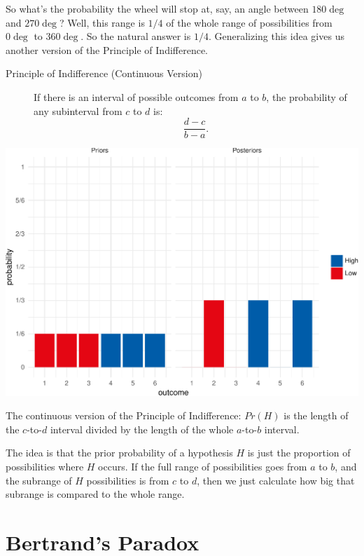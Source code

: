 \documentclass[justified]{tufte-book}
\theoremstyle{definition}
\theoremstyle{definition}
\theoremstyle{definition}
\theoremstyle{remark}
\begin{document}
So what's the probability the wheel will stop at, say, an angle between
\(180\deg\) and \(270\deg\)? Well, this range is \(1/4\) of the whole
range of possibilities from \(0\deg\) to \(360\deg\). So the natural
answer is \(1/4\). Generalizing this idea gives us another version of
the Principle of Indifference.

\begin{description}
\item[Principle of Indifference (Continuous Version)]
If there is an interval of possible outcomes from \(a\) to \(b\), the
probability of any subinterval from \(c\) to \(d\) is:
\[\frac{d-c}{b-a}.\]
\end{description}

\begin{marginfigure}
\includegraphics{_main_files/figure-latex/unnamed-chunk-132-1} \caption[The continuous version of the Principle of Indifference]{The continuous version of the Principle of Indifference: $Pr(H)$ is the length of the $c$-to-$d$ interval divided by the length of the whole $a$-to-$b$ interval.}\label{fig:unnamed-chunk-132}
\end{marginfigure}

The idea is that the prior probability of a hypothesis \(H\) is just the
proportion of possibilities where \(H\) occurs. If the full range of
possibilities goes from \(a\) to \(b\), and the subrange of \(H\)
possibilities is from \(c\) to \(d\), then we just calculate how big
that subrange is compared to the whole range.

\hypertarget{bertrands-paradox}{%
\section{Bertrand's Paradox}\label{bertrands-paradox}}
\end{document}
